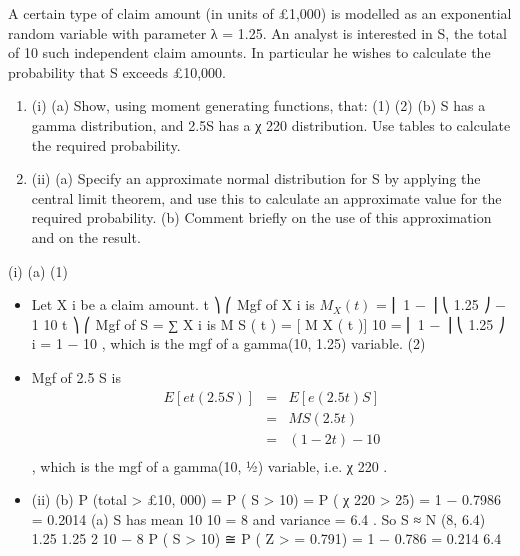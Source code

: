 \documentclass[a4paper,12pt]{article}
\begin{document}
A certain type of claim amount (in units of £1,000) is modelled as an exponential
random variable with parameter λ = 1.25. An analyst is interested in S, the total of 10
such independent claim amounts. In particular he wishes to calculate the probability
that S exceeds £10,000.
\begin{enumerate}
\item 
(i)
(a)
Show, using moment generating functions, that:
(1)
(2)
(b)
S has a gamma distribution, and
2.5S has a χ 220 distribution.
Use tables to calculate the required probability.
\item (ii)
(a) Specify an approximate normal distribution for S by applying the
central limit theorem, and use this to calculate an approximate value
for the required probability.
(b) Comment briefly on the use of this approximation and on the result.
\end{enumerate}
(i)
(a)
(1)
\begin{itemize}
\item Let X i be a claim amount.
t ⎞
⎛
Mgf of X i is $M_X ( t )$ = ⎜ 1 −
⎟
⎝ 1.25 ⎠
− 1
10
t ⎞
⎛
Mgf of S = ∑ X i is M S ( t ) = [ M X ( t )] 10 = ⎜ 1 −
⎟
⎝ 1.25 ⎠
i = 1
− 10
,
which is the mgf of a gamma(10, 1.25) variable.
(2)
\item Mgf of 2.5 S is \begin{eqnarray*}E [ e t (2.5 S ) ] &=& E [ e (2.5 t ) S ] \\ &=& M S (2.5 t ) \\ &=& (1 − 2 t ) − 10\\ 
\end{eqnarray*},
which is the mgf of a gamma(10, 1⁄2) variable, i.e. χ 220 .
\item (ii)
(b) P (total > £10, 000) = P ( S > 10) = P ( χ 220 > 25) = 1 − 0.7986 = 0.2014
(a) S has mean
10
10
= 8 and variance
= 6.4 . So S ≈ N (8, 6.4)
1.25
1.25 2
10 − 8
P ( S > 10) ≅ P ( Z >
= 0.791) = 1 − 0.786 = 0.214
6.4
\end{itemize}
\end{document}
